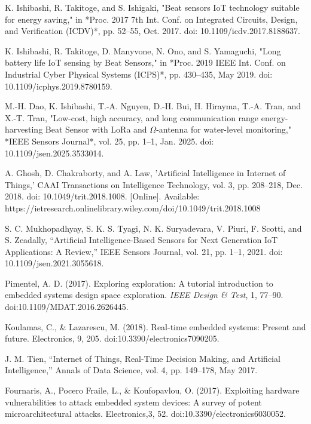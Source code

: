 \documentclass[conference]{IEEEtran}
\begin{document}
\begin{thebibliography}{00}
K. Ishibashi, R. Takitoge, and S. Ishigaki, 
"Beat sensors IoT technology suitable for energy saving," 
in *Proc. 2017 7th Int. Conf. on Integrated Circuits, Design, and Verification (ICDV)*, pp. 52--55, Oct. 2017. doi: 10.1109/icdv.2017.8188637.

K. Ishibashi, R. Takitoge, D. Manyvone, N. Ono, and S. Yamaguchi, 
"Long battery life IoT sensing by Beat Sensors," 
in *Proc. 2019 IEEE Int. Conf. on Industrial Cyber Physical Systems (ICPS)*, pp. 430--435, May 2019. doi: 10.1109/icphys.2019.8780159.

M.-H. Dao, K. Ishibashi, T.-A. Nguyen, D.-H. Bui, H. Hirayma, T.-A. Tran, and X.-T. Tran, 
"Low-cost, high accuracy, and long communication range energy-harvesting Beat Sensor with LoRa and $\Omega$-antenna for water-level monitoring,"
*IEEE Sensors Journal*, vol. 25, pp. 1--1, Jan. 2025. doi: 10.1109/jsen.2025.3533014.

 A. Ghosh, D. Chakraborty, and A. Law, 
'Artificial Intelligence in Internet of Things,' 
CAAI Transactions on Intelligence Technology, vol. 3, pp. 208--218, Dec. 2018. doi: 10.1049/trit.2018.1008. [Online]. Available: https://ietresearch.onlinelibrary.wiley.com/doi/10.1049/trit.2018.1008

 S. C. Mukhopadhyay, S. K. S. Tyagi, N. K. Suryadevara, V. Piuri, F. Scotti, and S. Zeadally, 
``Artificial Intelligence-Based Sensors for Next Generation IoT Applications: A Review,'' 
IEEE Sensors Journal, vol. 21, pp. 1--1, 2021. doi: 10.1109/jsen.2021.3055618.

Pimentel, A. D. (2017). Exploring exploration: A tutorial introduction to embedded systems design space exploration. \textit{IEEE Design \& Test}, 1, 77--90. doi:10.1109/MDAT.2016.2626445.

Koulamas, C., \& Lazarescu, M. (2018). Real-time embedded systems: Present and future. Electronics, 9, 205. doi:10.3390/electronics7090205.

 J. M. Tien, 
``Internet of Things, Real-Time Decision Making, and Artificial Intelligence,'' 
Annals of Data Science, vol. 4, pp. 149--178, May 2017.

Fournaris, A., Pocero Fraile, L., \& Koufopavlou, O. (2017). Exploiting hardware vulnerabilities to attack embedded system devices: A survey of potent microarchitectural attacks. Electronics,3, 52. doi:10.3390/electronics6030052.


\end{thebibliography}
\end{document}
